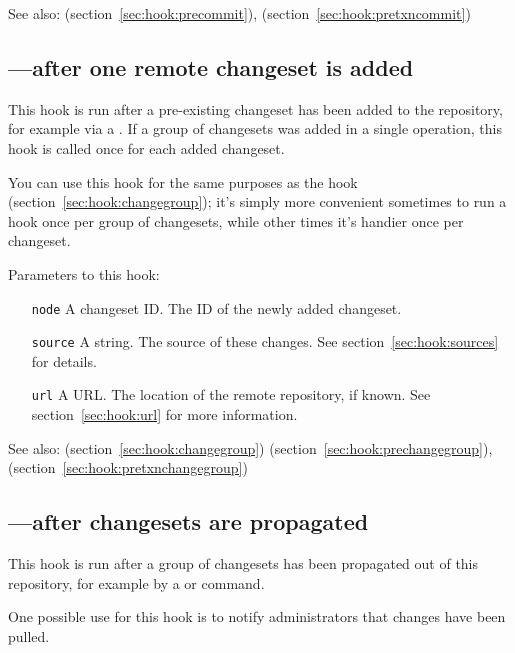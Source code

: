 See also:  (section~\ref{sec:hook:precommit}),
 (section~\ref{sec:hook:pretxncommit})

\subsection{---after one remote changeset is added}
\label{sec:hook:incoming}

This hook is run after a pre-existing changeset has been added to the
repository, for example via a .  If a group of changesets
was added in a single operation, this hook is called once for each
added changeset.

You can use this hook for the same purposes as the 
hook (section~\ref{sec:hook:changegroup}); it's simply more convenient
sometimes to run a hook once per group of changesets, while other
times it's handier once per changeset.

Parameters to this hook:
\begin{itemize}
\item[\texttt{node}] A changeset ID.  The ID of the newly added
  changeset.
\item[\texttt{source}] A string.  The source of these changes.  See
  section~\ref{sec:hook:sources} for details.
\item[\texttt{url}] A URL.  The location of the remote repository, if
  known.  See section~\ref{sec:hook:url} for more information.
\end{itemize}

See also:  (section~\ref{sec:hook:changegroup})  (section~\ref{sec:hook:prechangegroup}),  (section~\ref{sec:hook:pretxnchangegroup})

\subsection{---after changesets are propagated}
\label{sec:hook:outgoing}

This hook is run after a group of changesets has been propagated out
of this repository, for example by a  or 
command.

One possible use for this hook is to notify administrators that
changes have been pulled.


